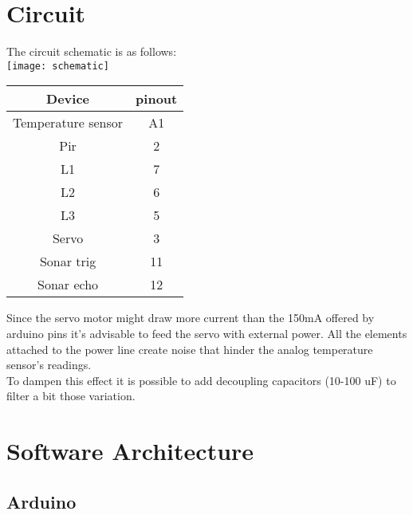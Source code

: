 \section{Circuit}
The circuit schematic is as follows:\\
\texttt{[image: schematic]}
\begin{center}
    \begin{tabular}{|c|c|}
        \hline
        Device             & pinout \\
        \hline
        \hline
        Temperature sensor & A1     \\
        \hline
        Pir                & 2      \\
        \hline
        L1                 & 7      \\
        \hline
        L2                 & 6      \\
        \hline
        L3                 & 5      \\
        \hline
        Servo              & 3      \\
        \hline
        Sonar trig         & 11     \\
        \hline
        Sonar echo        & 12     \\
        \hline
    \end{tabular}
\end{center}
Since the servo motor might draw more current than the 150mA offered by arduino pins it's advisable to feed the servo with external power.
All the elements attached to the power line create noise that hinder the analog temperature sensor's readings.\\
To dampen this effect it is possible to add decoupling capacitors (10-100 uF) to filter a bit those variation.
\pagebreak


\section{Software Architecture}
\subsection{Arduino}

